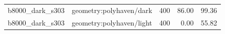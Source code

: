 \begin{longtable}{l>{\raggedright\arraybackslash}p{.42\linewidth}rrr}
b8000\_\allowbreak{}dark\_\allowbreak{}s303 & %
geometry:polyhaven/dark & %
400 & %
86.00 & %
99.36 \\ %

b8000\_\allowbreak{}dark\_\allowbreak{}s303 & %
geometry:polyhaven/light & %
400 & %
0.00 & %
55.82 \\ %


\end{longtable}
